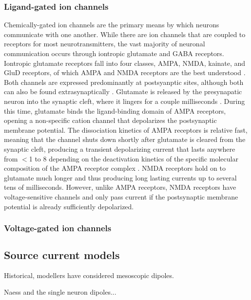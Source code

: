 \subsubsection{Ligand-gated ion channels}
Chemically-gated ion channels are the primary means by which neurons communicate with one another. While there are ion channels that are coupled to receptors for most neurotransmitters, the vast majority of neuronal communication occurs through iontropic glutamate and GABA receptors. Iontropic glutamate receptors fall into four classes, AMPA, NMDA, kainate, and GluD receptors, of which AMPA and NMDA receptors are the best understood \cite{Hansen2021}. Both channels are expressed predominantly at postsyanptic sites, although both can also be found extrasynaptically \cite{Clark2002,Lin2009}. Glutamate is released by the presynapatic neuron into the synaptic cleft, where it lingers for a couple milliseconds \cite{Clements1992}. During this time, glutamate binds the ligand-binding domain of AMPA receptors, opening a non-specific cation channel that depolarizes the postsynaptic membrane potential. The dissociation kinetics of AMPA receptors is relative fast, meaning that the channel shuts down shortly after glutamate is cleared from the synaptic cleft, producing a transient depolarizing current that lasts anywhere from $<$\qty{1}{\millsecond} to \qty{8}{\millsecond} depending on the deactivation kinetics of the specific molecular composition of the AMPA receptor complex \cite{Geiger1997,Howe2015,Greger2017}. NMDA receptors hold on to glutamate much longer and thus producing long lasting currents up to several tens of milliseconds. However, unlike AMPA receptors, NMDA receptors have voltage-sensitive channels and only pass current if the postsynaptic membrane potential is already sufficiently depolarized. 

\subsubsection{Voltage-gated ion channels}

\subsection{Source current models}
Historical, modellers have considered mesoscopic dipoles.

Naess and the single neuron dipoles...


